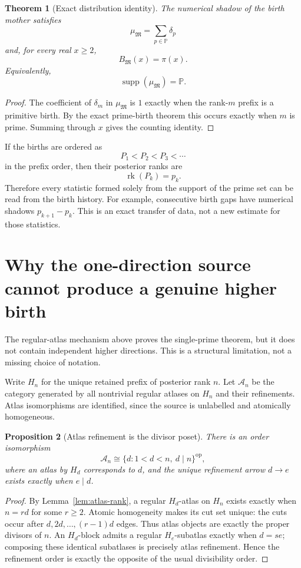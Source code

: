\documentclass[11pt]{article}
\newtheorem{theorem}{Theorem}[section]
\newtheorem{proposition}[theorem]{Proposition}
\newcommand{\rk}{\operatorname{rk}}
\newcommand{\supp}{\operatorname{supp}}
\newcommand{\PP}{\mathbb P}
\begin{document}
\begin{theorem}[Exact distribution identity]
The numerical shadow of the birth mother satisfies
\[
\boxed{
\mu_{\mathfrak M}=\sum_{p\in\PP}\delta_p
}
\]
and, for every real $x\ge2$,
\[
\boxed{
B_{\mathfrak M}(x)=\pi(x).
}
\]
Equivalently,
\[
\supp(\mu_{\mathfrak M})=\PP.
\]
\end{theorem}

\begin{proof}
The coefficient of $\delta_m$ in $\mu_{\mathfrak M}$ is $1$ exactly when the
rank-$m$ prefix is a primitive birth.  By the exact prime-birth theorem this
occurs exactly when $m$ is prime.  Summing through $x$ gives the counting
identity.
\end{proof}

If the births are ordered as
\[
P_1<P_2<P_3<\cdots
\]
in the prefix order, then their posterior ranks are
\[
\rk(P_k)=p_k.
\]
Therefore every statistic formed solely from the support of the prime set can
be read from the birth history.  For example, consecutive birth gaps have
numerical shadows $p_{k+1}-p_k$.  This is an exact transfer of data, not a new
estimate for those statistics.

\section{Why the one-direction source cannot produce a genuine higher birth}

The regular-atlas mechanism above proves the single-prime theorem, but it does
not contain independent higher directions.  This is a structural limitation,
not a missing choice of notation.

Write \(H_n\) for the unique retained prefix of posterior rank \(n\).  Let
\(\mathcal A_n\) be the category generated by all nontrivial regular atlases on
\(H_n\) and their refinements.  Atlas isomorphisms are identified, since the
source is unlabelled and atomically homogeneous.

\begin{proposition}[Atlas refinement is the divisor poset]
\label{prop:atlas-divisor}
There is an order isomorphism
\[
\boxed{
\mathcal A_n
\cong
\{d:1<d<n,\ d\mid n\}^{\mathrm{op}},
}
\]
where an atlas by \(H_d\) corresponds to \(d\), and the unique refinement
arrow \(d\to e\) exists exactly when \(e\mid d\).
\end{proposition}

\begin{proof}
By Lemma~\ref{lem:atlas-rank}, a regular \(H_d\)-atlas on \(H_n\) exists exactly
when \(n=r d\) for some \(r\ge2\).  Atomic homogeneity makes its cut set unique:
the cuts occur after \(d,2d,\ldots,(r-1)d\) edges.  Thus atlas objects are
exactly the proper divisors of \(n\).  An \(H_d\)-block admits a regular
\(H_e\)-subatlas exactly when \(d=s e\); composing these identical subatlases
is precisely atlas refinement.  Hence the refinement order is exactly the
opposite of the usual divisibility order.
\end{proof}
\end{document}
